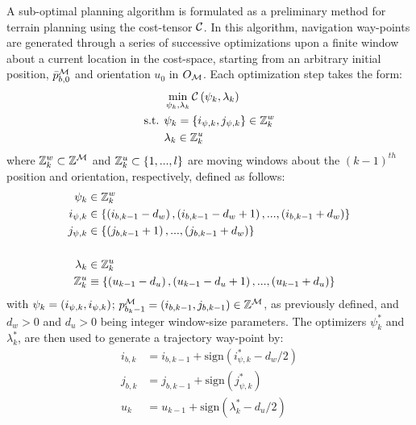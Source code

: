 			A sub-optimal planning algorithm is formulated as a preliminary method for terrain planning using the cost-tensor ${\cal C}$. In this algorithm, navigation way-points are generated through a series of successive optimizations upon a finite window about a current location in the cost-space, starting from an arbitrary initial position, $\bar{p}^{{\cal M}}_{b,0}$ and orientation $u_{0}$ in $O_{{\cal M}}$. Each optimization step takes the form:
				\begin{equation}
					\begin{split}
							&	\min_{\psi_{k},\lambda_{k}}{\cal C}\left(\psi_{k},\lambda_{k}\right) 	\\
					\text{s.t. }&	\psi_{k}=\{i_{\psi,k},j_{\psi,k}\}\in{\Bbb Z}^{w}_{k}							\\
							&	\lambda_{k}\in{\Bbb Z}^{u}_{k}
					\end{split}
				\end{equation}
			where ${\Bbb Z}^{w}_{k}\subset{\Bbb Z}^{{\cal M}}$ and ${\Bbb Z}^{u}_{k}\subset \{ 1,...,l \}$ are moving windows about the $(k-1)^{th}$ position and orientation, respectively, defined as follows:
				\begin{equation}
					\begin{split}
						\psi_{k}	& \in {\Bbb Z}^{w}_{k} \\
						i_{\psi,k} 	& \in \{ \left(i_{b,k-1}-d_{w}\right),\left(i_{b,k-1}-d_{w}+1\right),...,\left(i_{b,k-1}+d_{w}\right) \} 	\\
						j_{\psi,k} 	& \in \{ \left(j_{b,k-1}+1\right),...,\left(j_{b,k-1}+d_{w}\right) \} 	\\
									& \\
						\lambda_{k}	& \in {\Bbb Z}^{u}_{k}\\
						{\Bbb Z}^{u}_{k}	&\equiv   \{ \left(u_{k-1}-d_{u}\right), \left(u_{k-1}-d_{u}+1\right), ... , \left(u_{k-1}+d_{u}\right) \}
					\end{split}
					\label{eq::windows}
				\end{equation}			
			with $\psi_{k} = \left(i_{\psi,k},i_{\psi,k}\right)$; $p_{b_k-1}^{{\cal M}} = \left(i_{b,k-1},j_{b,k-1}\right) \in {\Bbb Z}^{{\cal M}}$, as previously defined, and $d_{w}>0$ and $d_{u}>0$ being integer window-size parameters. The optimizers $\psi_{k}^{*}$ and $\lambda_{k}^{*}$, are then used to generate a \Kth trajectory way-point by:
				\begin{equation}
					\begin{split}
						i_{b,k} &= i_{b,k-1} 	+ \text{sign}(i_{\psi,k}^{*} -d_{w}/2) 	\\
						j_{b,k} &= j_{b,k-1} 	+ \text{sign}(j_{\psi,k}^{*}) 			\\
						u_{k} 	&= u_{k-1} 		+ \text{sign}(\lambda_{k}^{*}-d_{u}/2) 	\\
					\end{split}
				\end{equation}
